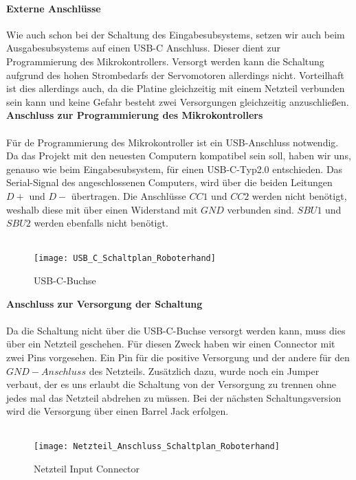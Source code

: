 \documentclass[titlepage,12pt,twoside]{article}
\begin{document}
\paragraph{Externe Anschlüsse}
\hfill \break
\hfill \break
Wie auch schon bei der Schaltung des Eingabesubsystems, setzen wir auch beim Ausgabesubsystems auf einen USB-C Anschluss.
Dieser dient zur Programmierung des Mikrokontrollers. Versorgt werden kann die Schaltung aufgrund des hohen Strombedarfs der Servomotoren
allerdings nicht. Vorteilhaft ist dies allerdings auch, da die Platine gleichzeitig mit einem Netzteil verbunden sein kann und keine 
Gefahr besteht zwei Versorgungen gleichzeitig anzuschließen. 
\textbf{Anschluss zur Programmierung des Mikrokontrollers} \\
\\
Für de Programmierung des Mikrokontroller ist ein USB-Anschluss notwendig. Da das Projekt mit den neuesten Computern
kompatibel sein soll, haben wir uns, genauso wie beim Eingabesubsystem, für einen USB-C-Typ2.0 entschieden. Das Serial-Signal
des angeschlossenen Computers, wird über die beiden Leitungen $D+$ und $D-$ übertragen. Die Anschlüsse $CC1$ und $CC2$ werden
nicht benötigt, weshalb diese mit über einen Widerstand mit $GND$ verbunden sind. $SBU1$ und $SBU2$ werden ebenfalls nicht 
benötigt. \\
\\
\begin{figure}[H]
	\begin{center}
		\scalebox{1.0}
		{\texttt{[image: USB\_C\_Schaltplan\_Roboterhand]}}
		\caption{USB-C-Buchse}
		\label{fig:USB_C_Schaltplan_Roboterhand}		
	\end{center}
\end{figure}
\hfill \break
\textbf{Anschluss zur Versorgung der Schaltung} \\
\\
Da die Schaltung nicht über die USB-C-Buchse versorgt werden kann, muss dies über ein Netzteil geschehen. Für diesen Zweck
haben wir einen Connector mit zwei Pins vorgesehen. Ein Pin für die positive Versorgung und der andere für den $GND-Anschluss$
des Netzteils.  Zusätzlich dazu, wurde noch ein Jumper verbaut, der es uns erlaubt die Schaltung von der Versorgung zu trennen
ohne jedes mal das Netzteil abdrehen zu müssen. Bei der nächsten Schaltungsversion wird die Versorgung über einen Barrel Jack
erfolgen. \\
\\
\begin{figure}[H]
	\begin{center}
		\scalebox{1.0}
		{\texttt{[image: Netzteil\_Anschluss\_Schaltplan\_Roboterhand]}}
		\caption{Netzteil Input Connector}
		\label{fig:Netzteil_Anschluss_Schaltplan_Roboterhand}		
	\end{center}
\end{figure}
\hfill \break
\end{document}
